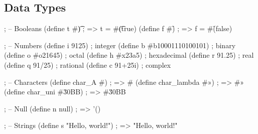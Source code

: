 
\subsection{Data Types}

\begin{racketcode}
; -- Booleans
(define t #\t) ; => t = #\t (true)
(define f #\f) ; => f = #\f (false)

; -- Numbers
(define i 9125)               ; integer
(define b #b10001110100101)    ; binary
(define o #o21645)              ; octal
(define h #x23a5)               ; hexadecimal
(define r 91.25)              ; real
(define q 91/25)              ; rational
(define c 91+25i)             ; complex

; -- Characters
(define char_A #\A)           ; => #\A
(define char_lambda #\Î»)      ; => #\Î»
(define char_uni #\u30BB)     ; => #\u30BB

; -- Null
(define n null) ; => '()

; -- Strings
(define s "Hello, world!") ; => "Hello, world!"
\end{racketcode}